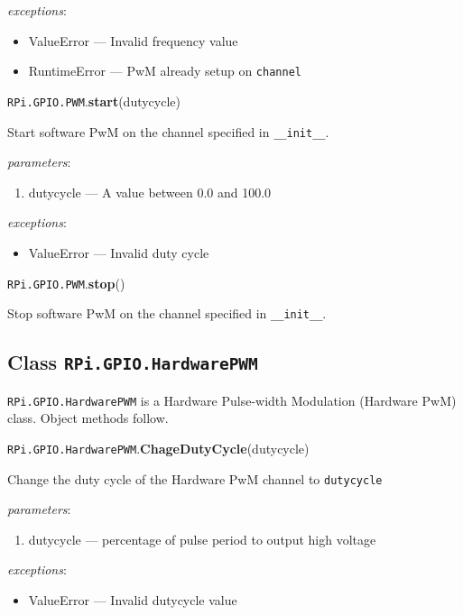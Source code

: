 \documentclass[12pt]{article}
\begin{document}
 
\textit{exceptions}:
\begin{itemize}
    \item ValueError --- Invalid frequency value
    \item RuntimeError --- PwM already setup on \texttt{channel}
\end{itemize}

\noindent \texttt{RPi.GPIO.PWM}.\textbf{start}(dutycycle)
        
Start software PwM on the channel specified in \texttt{\_\_init\_\_}.

\textit{parameters}:
\begin{enumerate}      
        \item dutycycle --- A value between 0.0 and 100.0
\end{enumerate}
 
 
\textit{exceptions}:
\begin{itemize}
    \item ValueError --- Invalid duty cycle
\end{itemize}

\noindent \texttt{RPi.GPIO.PWM}.\textbf{stop}()
        
Stop software PwM on the channel specified in \texttt{\_\_init\_\_}.

\medskip \medskip

\subsection{Class \texttt{RPi.GPIO.HardwarePWM}} \label{hardwarepwm}
    
\texttt{RPi.GPIO.HardwarePWM} is a Hardware Pulse-width Modulation (Hardware PwM) class. Object methods follow.

\medskip \medskip

\noindent \texttt{RPi.GPIO.HardwarePWM}.\textbf{ChageDutyCycle}(dutycycle)
        
Change the duty cycle of the Hardware PwM channel to \texttt{dutycycle}
        
\textit{parameters}:
\begin{enumerate}      
        \item dutycycle --- percentage of pulse period to output high voltage
\end{enumerate}
 
 
\textit{exceptions}:
\begin{itemize}
    \item ValueError --- Invalid dutycycle value
\end{itemize}
\end{document}
